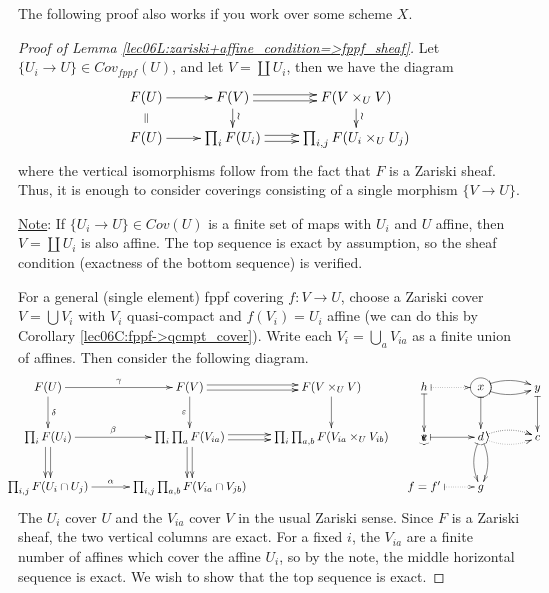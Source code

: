 \begin{remark}
  The following proof also works if you work over some scheme $X$.
\end{remark}
\begin{proof}[Proof of Lemma \ref{lec06L:zariski+affine_condition=>fppf_sheaf}]
  Let $\{U_i\to U\}\in Cov_{fppf}(U)$, and let $V=\coprod U_i$, then we have the diagram
  \[\xymatrix@R-1pc{
    F(U)\ar[r] \ar@{}[d]|{\parallel} & F(V) \ar@<.5ex>[r] \ar@<-.5ex>[r] \ar[d]^(.45){\wr} &
    F(V\times_U V) \ar[d]^(.45)\wr\\
    F(U) \ar[r] & \prod_i F(U_i) \ar@<.5ex>[r] \ar@<-.5ex>[r]& \prod_{i,j} F(U_i\times_U
    U_j)
  }\]
   where the vertical isomorphisms follow from the fact that $F$ is a Zariski sheaf.
  Thus, it is enough to consider coverings consisting of a single morphism $\{V\to U\}$.

  \underline{Note}: If $\{U_i\to U\}\in Cov(U)$ is a finite set of maps with $U_i$ and
  $U$ affine, then $V=\coprod U_i$ is also affine. The top sequence is exact by
  assumption, so the sheaf condition (exactness of the bottom sequence) is verified.

  For a general (single element) fppf covering $f:V\to U$, choose a Zariski cover
  $V=\bigcup V_i$ with $V_i$ quasi-compact and $f(V_i)=U_i$ affine (we can do this by
  Corollary \ref{lec06C:fppf->qcmpt_cover}). Write each $V_i=\bigcup_a V_{ia}$ as a
  finite union of affines. Then consider the following diagram.
  \[\hspace*{-3ex}
  \xymatrix@!0 @R=3.5pc @C=10pc{
   F(U)\ar[r]^<>(.5)\gamma \ar[d]^\delta
   & F(V) \ar@<.5ex>[r] \ar@<-.5ex>[r] \ar[d]_\varepsilon
   & F(V\times_UV) \ar[d]\\
   \prod_iF(U_i) \ar@<.5ex>[d] \ar@<-.5ex>[d] \ar[r]^<>(.5)\beta
   & \prod_i \prod_a F(V_{ia})\ar@<.5ex>[d] \ar@<-.5ex>[d] \ar@<.5ex>[r] \ar@<-.5ex>[r]
   & \prod_{i} \prod_{a,b} F(V_{ia}\times_U V_{ib})\\
   \prod_{i,j} F(U_i\cap U_j) \ar[r]^<>(.5)\alpha
   & \prod_{i,j}\prod_{a,b} F(V_{ia}\cap V_{jb})
  }\quad
  \xymatrix@!0 @R=3.5pc @C=4pc{
   h\ar@{|->}[d] \ar@{|.>}[r]
   & *++[o][F-]{x} \ar@{|->}[d] \ar@/^/@{|->}[r] \ar@/_/@{|->}[r]
   & y \ar@{|->}[d] \\
   e \ar@{|->}p+(-.3,-1) \ar@{|->}p+(.3,-1) \ar@{|->}[r]
   & d \ar@/^/@{|.>}[r] \ar@/^/@{|.>}[r] \ar@/_/@{|.>}[r] \ar@/_/@{|->}[d] \ar@/^/@{|->}[d]
   & c\\
   f=f' \ar@{|.>}[r] & g
  }\hspace*{-2em}\]
  The $U_i$ cover $U$ and the $V_{ia}$ cover $V$ in the usual Zariski sense. Since $F$
  is a Zariski sheaf, the two vertical columns are exact. For a fixed $i$, the $V_{ia}$
  are a finite number of affines which cover the affine $U_i$, so by the note, the
  middle horizontal sequence is exact. We wish to show that the top sequence is exact.


\end{proof}
